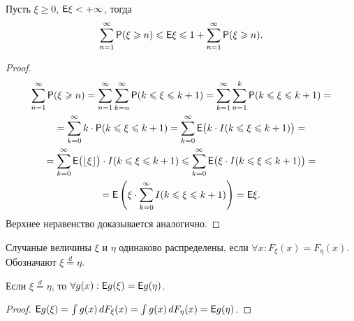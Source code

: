 \begin{lemma}
	Пусть $\xi \geqslant 0$, $\mathsf{E} \xi < + \infty$, тогда 
	$$ \sum\limits_{n=1}^\infty \mathsf{P} (\xi \geqslant n) \leqslant \mathsf{E} \xi \leqslant 1 + \sum\limits_{n = 1}^\infty \mathsf{P} ( \xi \geqslant n).$$
	\begin{proof}
		\begin{multline*}
			\sum\limits_{n = 1}^\infty \mathsf{P} ( \xi \geqslant n) = 
			\sum\limits_{n = 1}^\infty \sum\limits_{k = n}^\infty \mathsf{P} (k \leqslant \xi \leqslant k + 1) = 
			\sum\limits_{k =1}^\infty \sum\limits_{n = 1}^{k} \mathsf{P}( k \leqslant \xi \leqslant k + 1) = \\ = 
			\sum\limits_{k = 0}^{\infty} k \cdot \mathsf{P} ( k \leqslant \xi \leqslant k + 1) = 
			\sum\limits_{k = 0}^\infty \mathsf{E} \big( k \cdot I (k \leqslant \xi  \leqslant k + 1) \big) = \\ = 
			\sum\limits_{k = 0}^\infty \mathsf{E} \big( \lfloor \xi \rfloor \big) \cdot I (k \leqslant \xi \leqslant k + 1 ) \leqslant
			\sum\limits_{k = 0}^\infty \mathsf{E} \big( \xi \cdot I ( k \leqslant \xi \leqslant k+ 1) \big) = \\ =
			\mathsf{E} \left( \xi \cdot \sum\limits_{k = 0}^\infty I (k \leqslant \xi \leqslant k + 1) \right) = \mathsf{E} \xi.
		\end{multline*}
		Верхнее неравенство доказывается аналогично.
	\end{proof}
\end{lemma}
\begin{definition}
	Случаные величины $\xi $ и $\eta$ одинаково распределены, если  $\forall x: F_\xi (x) = F_\eta(x)$. Обозначают $\xi \overset{d}{=} \eta$.
\end{definition}
\begin{statement}
Если $\xi \overset{d}{=} \eta$, то $\forall g(x): \mathsf{E} g(\xi) = \mathsf{E} g(\eta)$.
\begin{proof}
	$\mathsf{E} g(\xi) = \int g(x) \, d F_\xi(x) = \int g(x) \, d F_\eta(x) = \mathsf{E} g(\eta)$.
\end{proof}	
\end{statement}
